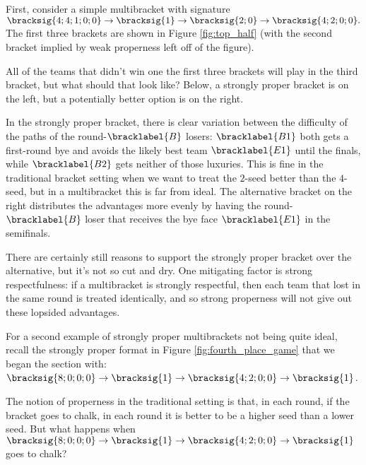 {    First, consider a simple multibracket with signature $\bracksig{4;4;1;0;0} \to \bracksig{1} \to \bracksig{2;0} \to \bracksig{4;2;0;0}.$ The first three brackets are shown in Figure \ref{fig:top_half} (with the second bracket implied by weak properness left off of the figure).


    All of the teams that didn't win one the first three brackets will play in the third bracket, but what should that look like? Below, a strongly proper bracket is on the left, but a potentially better option is on the right.


    In the strongly proper bracket, there is clear variation between the difficulty of the paths of the round-$\bracklabel{B}$ losers: $\bracklabel{B1}$ both gets a first-round bye and avoids the likely best team $\bracklabel{E1}$ until the finals, while $\bracklabel{B2}$ gets neither of those luxuries. This is fine in the traditional bracket setting when we want to treat the $2$-seed better than the $4$-seed, but in a multibracket this is far from ideal. The alternative bracket on the right distributes the advantages more evenly by having the round-$\bracklabel{B}$ loser that receives the bye face $\bracklabel{E1}$ in the semifinals.
    
    There are certainly still reasons to support the strongly proper bracket over the alternative, but it's not so cut and dry. One mitigating factor is strong respectfulness: if a multibracket is strongly respectful, then each team that lost in the same round is treated identically, and so strong properness will not give out these lopsided advantages. 

    For a second example of strongly proper multibrackets not being quite ideal, recall the strongly proper format in Figure \ref{fig:fourth_place_game} that we began the section with: $\bracksig{8;0;0;0} \to \bracksig{1} \to \bracksig{4; 2; 0; 0} \to \bracksig{1}$.

    The notion of properness in the traditional setting is that, in each round, if the bracket goes to chalk, in each round it is better to be a higher seed than a lower seed. But what happens when $\bracksig{8;0;0;0} \to \bracksig{1} \to \bracksig{4; 2; 0; 0} \to \bracksig{1}$ goes to chalk?


}
